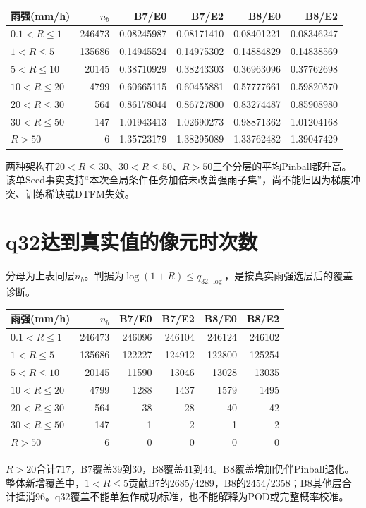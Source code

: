 \documentclass[UTF8,10.5pt,a4paper,fontset=none]{ctexart}
\begin{document}
{\small
\begin{tabularx}{\textwidth}{@{}lrrrrr@{}}
\toprule 雨强(mm/h) & $n_b$ & B7/E0 & B7/E2 & B8/E0 & B8/E2\\\midrule
$0.1<R\leq1$ & 246473 & 0.08245987 & 0.08171410 & 0.08401221 & 0.08346247\\
$1<R\leq5$ & 135686 & 0.14945524 & 0.14975302 & 0.14884829 & 0.14838569\\
$5<R\leq10$ & 20145 & 0.38710929 & 0.38243303 & 0.36963096 & 0.37762698\\
$10<R\leq20$ & 4799 & 0.60665115 & 0.60455881 & 0.57777661 & 0.59820570\\
$20<R\leq30$ & 564 & 0.86178044 & 0.86727800 & 0.83274487 & 0.85908980\\
$30<R\leq50$ & 147 & 1.01943413 & 1.02690273 & 0.98871362 & 1.01204168\\
$R>50$ & 6 & 1.35723179 & 1.38295089 & 1.33762482 & 1.39047429\\
\bottomrule
\end{tabularx}}

两种架构在$20<R\leq30$、$30<R\leq50$、$R>50$三个分层的平均Pinball都升高。该单Seed事实支持“本次全局条件任务加倍未改善强雨子集”，尚不能归因为梯度冲突、训练稀缺或DTFM失效。

\section*{q32达到真实值的像元时次数}
分母为上表同层$n_b$。判据为$\log(1+R)\leq q_{32,\log}$，是按真实雨强选层后的覆盖诊断。

{\small
\begin{tabularx}{\textwidth}{@{}lrrrrr@{}}
\toprule 雨强(mm/h) & $n_b$ & B7/E0 & B7/E2 & B8/E0 & B8/E2\\\midrule
$0.1<R\leq1$ & 246473 & 246096 & 246104 & 246124 & 246102\\
$1<R\leq5$ & 135686 & 122227 & 124912 & 122800 & 125254\\
$5<R\leq10$ & 20145 & 11590 & 13046 & 13028 & 13035\\
$10<R\leq20$ & 4799 & 1288 & 1437 & 1579 & 1495\\
$20<R\leq30$ & 564 & 38 & 28 & 40 & 42\\
$30<R\leq50$ & 147 & 1 & 2 & 1 & 2\\
$R>50$ & 6 & 0 & 0 & 0 & 0\\
\bottomrule
\end{tabularx}}

$R>20$合计717，B7覆盖39到30，B8覆盖41到44。B8覆盖增加仍伴Pinball退化。整体新增覆盖中，$1<R\leq5$贡献B7的2685/4289，B8的2454/2358；B8其他层合计抵消96。q32覆盖不能单独作成功标准，也不能解释为POD或完整概率校准。
\end{document}
